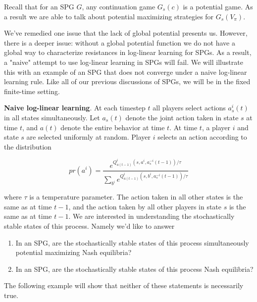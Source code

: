 Recall that for an SPG $G$, any continuation game $G_s(c)$ is a potential game. As a result we are able to talk about potential maximizing strategies for $G_s(V_{\pi})$. 


We've remedied one issue that the lack of global potential presents us. However, there is a deeper issue: without a global potential function we do not have a global way to characterize resistances in log-linear learning for SPGs. As a result, a "naive" attempt to use log-linear learning in SPGs will fail. We will illustrate this with an example of an SPG that does not converge under a naive log-linear learning rule. Like all of our previous discussions of SPGs, we will be in the fixed finite-time setting.

{\bf Naive log-linear learning}. At each timestep $t$ all players select actions $a^i_s(t)$ in all states simultaneously. Let $a_s(t)$ denote the joint action taken in state $s$ at time $t$, and $a(t)$ denote the entire behavior at time $t$. At time $t$, a player $i$ and state $s$ are selected uniformly at random. Player $i$ selects an action according to the distribution

$$
pr(a^i) = \dfrac{e^{Q^i_{a(t-1)}(s, a^i, a^{-i}_s(t-1))/\tau}}{\sum_{b^i}e^{Q^i_{a(t-1)}(s, b^i, a^{-i}_s(t-1))/\tau}}
$$

where $\tau$ is a temperature parameter. The action taken in all other states is the same as at time $t-1$, and the action taken by all other players in state $s$ is the same as at time $t-1$. We are interested in understanding the stochastically stable states of this process. Namely we'd like to answer

\begin{enumerate}
\item In an SPG, are the stochastically stable states of this process simultaneously potential maximizing Nash equilibria?
\item In an SPG, are the stochastically stable states of this process Nash equilibria?
\end{enumerate}

The following example will show that neither of these statements is necessarily true.


